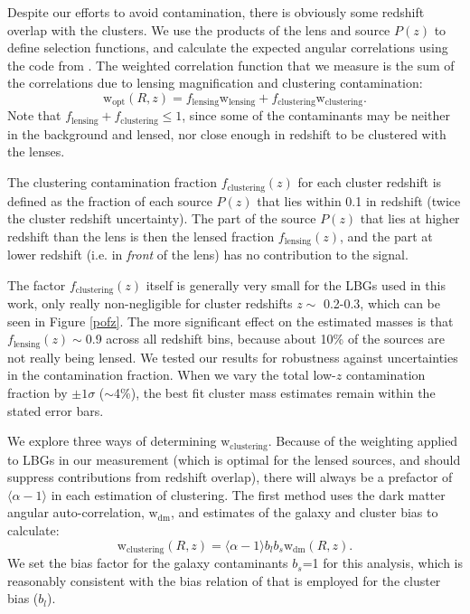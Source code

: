Despite our efforts to avoid contamination, there is obviously some redshift overlap with the clusters. We use the products of the lens and source $P(z)$ to define selection functions, and calculate the expected angular correlations using the code from \citet{Hamana04}. The weighted correlation function that we measure is the sum of the correlations due to lensing magnification and clustering contamination:
\begin{equation}
\mathrm{w}_{\mathrm{opt}}(R,z) = f_{\mathrm{lensing}}\mathrm{w}_{\mathrm{lensing}} + f_{\mathrm{clustering}}\mathrm{w}_{\mathrm{clustering}}.
\end{equation}
Note that $f_{\mathrm{lensing}}+f_{\mathrm{clustering}} \leq 1$, since some of the contaminants may be neither in the background and lensed, nor close enough in redshift to be clustered with the lenses.

The clustering contamination fraction $f_{\mathrm{clustering}}(z)$ for each cluster redshift is defined as the fraction of each source $P(z)$ that lies within 0.1 in redshift (twice the cluster redshift uncertainty). The part of the source $P(z)$ that lies at higher redshift than the lens is then the lensed fraction $f_{\mathrm{lensing}}(z)$, and the part at lower redshift (i.e. in {\it front} of the lens) has no contribution to the signal.

The factor $f_{\mathrm{clustering}}(z)$ itself is generally very small for the LBGs used in this work, only really non-negligible for cluster redshifts $z \sim$ 0.2-0.3, which can be seen in Figure \ref{pofz}. The more significant effect on the estimated masses is that $f_{\mathrm{lensing}}(z) \sim$0.9 across all redshift bins, because about 10\% of the sources are not really being lensed. We tested our results for robustness against uncertainties in the contamination fraction. When we vary the total low-$z$ contamination fraction by $\pm1\sigma$ ($\sim$4\%), the best fit cluster mass estimates remain within the stated error bars.


We explore three ways of determining $\mathrm{w}_{\mathrm{clustering}}$. Because of the weighting applied to LBGs in our measurement (which is optimal for the lensed sources, and should suppress contributions from redshift overlap), there will always be a prefactor of $\langle \alpha-1 \rangle$ in each estimation of clustering. The first method uses the dark matter angular auto-correlation, $\mathrm{w}_{\mathrm{dm}}$, and estimates of the galaxy and cluster bias to calculate:
\begin{equation}
\mathrm{w}_{\mathrm{clustering}}(R,z) = \langle \alpha-1 \rangle b_{l} b_{s} \mathrm{w}_{\mathrm{dm}}(R,z).
\label{model1}
\end{equation}
We set the bias factor for the galaxy contaminants $b_s$=1 for this analysis, which is reasonably consistent with the bias relation of \citet{Seljak04} that is employed for the cluster bias ($b_{l}$).


